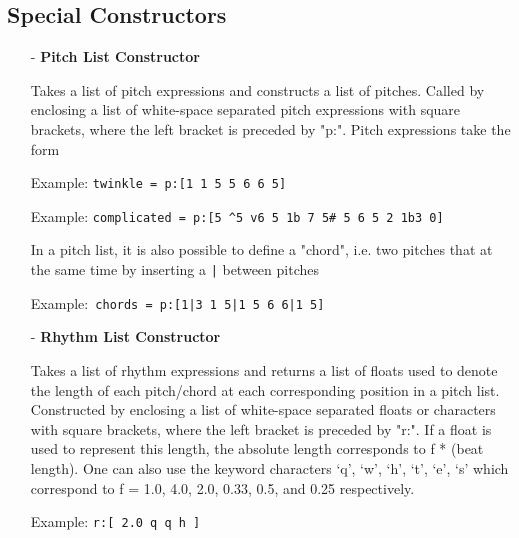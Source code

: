 \documentclass[12pt]{report}
\begin{document}
\subsection{Special Constructors}			
\begin{itemize}

\item[-] \textbf{Pitch List Constructor}   %

			Takes a list of pitch expressions and constructs a list of pitches. Called by enclosing a list of white-space separated pitch expressions with square brackets, where the left bracket is preceded by "p:". Pitch expressions take the form  

			Example: \texttt{twinkle = p:[1 1 5 5 6 6 5]} 
			
			Example: \texttt{complicated = p:[5 \textasciicircum5 v6 5 1b 7 5\# 5 6 5 2 1b3 0]}
			
			In a pitch list, it is also possible to define a "chord", i.e. two pitches that at the same time by inserting a \texttt{|} between pitches
			
			Example:\texttt{ chords = p:[1|3 1 5|1 5 6 6|1 5]} 

\item[-]  \textbf{Rhythm List Constructor}

			Takes a list of rhythm expressions and returns a list of floats used to denote the length of each pitch/chord at each corresponding position in a pitch list. Constructed by enclosing a list of white-space separated floats or characters with square brackets, where the left bracket is preceded by "r:". If a float is used to represent this length, the absolute length corresponds to f * (beat length). One can also use the keyword characters ‘q’, ‘w’, ‘h’, ‘t’, ‘e’, ‘s’ which correspond to f = 1.0, 4.0, 2.0, 0.33, 0.5, and 0.25 respectively.

			Example: \texttt{r:[ 2.0 q q h ]}


	







\end{itemize}
\end{document}
